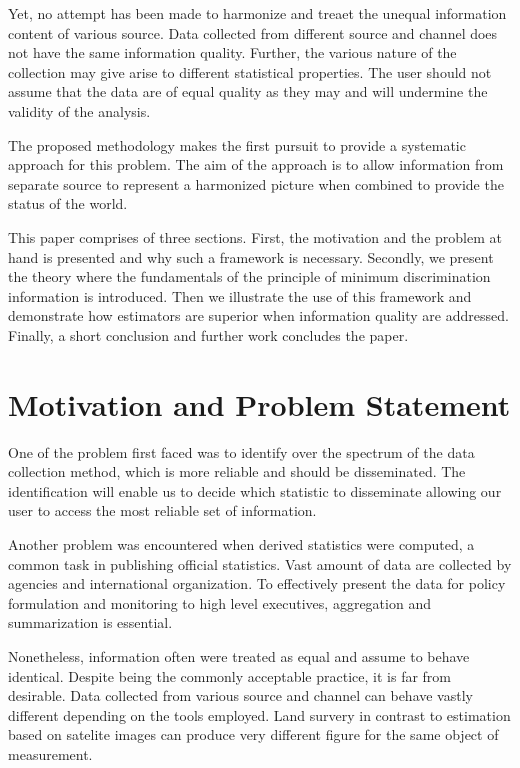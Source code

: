 \documentclass[nojss]{jss}
\begin{document}
Yet, no attempt has been made to harmonize and treaet the unequal
information content of various source. Data collected from different
source and channel does not have the same information
quality. Further, the various nature of the collection may give arise
to different statistical properties. The user should not assume that
the data are of equal quality as they may and will undermine the
validity of the analysis.


The proposed methodology makes the first pursuit to provide a
systematic approach for this problem. The aim of the approach is to
allow information from separate source to represent a harmonized
picture when combined to provide the status of the world.

This paper comprises of three sections. First, the motivation and the
problem at hand is presented and why such a framework is
necessary. Secondly, we present the theory where the fundamentals of
the principle of minimum discrimination information is
introduced. Then we illustrate the use of this framework and
demonstrate how estimators are superior when information quality are
addressed. Finally, a short conclusion and further work concludes the
paper.

\section{Motivation and Problem Statement}

One of the problem first faced was to identify over the spectrum of
the data collection method, which is more reliable and should be
disseminated. The identification will enable us to decide which
statistic to disseminate allowing our user to access the most reliable
set of information.

Another problem was encountered when derived statistics were computed,
a common task in publishing official statistics. Vast amount of data
are collected by agencies and international organization. To
effectively present the data for policy formulation and monitoring to
high level executives, aggregation and summarization is essential.


Nonetheless, information often were treated as equal and assume to
behave identical. Despite being the commonly acceptable practice, it
is far from desirable. Data collected from various source and channel
can behave vastly different depending on the tools employed. Land
survery in contrast to estimation based on satelite images can produce
very different figure for the same object of measurement.
\end{document}
